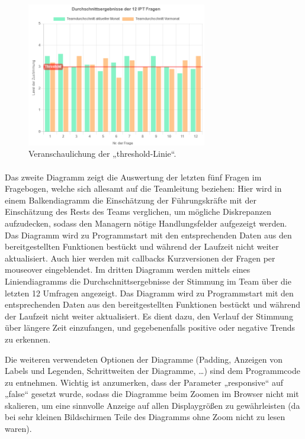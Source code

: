 \documentclass[a4paper,12pt,]{article}
\begin{document}
\begin{figure}[htb]
\centering
\includegraphics[width=0.7\textwidth]{picture.png}
\caption{Veranschaulichung der „threshold-Linie“.}
\end{figure}

\paragraph{}Das zweite Diagramm zeigt die Auswertung der letzten fünf Fragen im Fragebogen, welche sich allesamt auf die Teamleitung beziehen: Hier wird in einem Balkendiagramm die Einschätzung der Führungskräfte mit der Einschätzung des Rests des Teams verglichen, um mögliche Diskrepanzen aufzudecken, sodass den Managern nötige Handlungsfelder aufgezeigt werden. Das Diagramm wird zu Programmstart mit den entsprechenden Daten aus den bereitgestellten Funktionen bestückt und während der Laufzeit nicht weiter aktualisiert. Auch hier werden mit callbacks Kurzversionen der Fragen per mouseover eingeblendet.
Im dritten Diagramm werden mittels eines Liniendiagramms die Durchschnittsergebnisse der Stimmung im Team über die letzten 12 Umfragen angezeigt. Das Diagramm wird zu Programmstart mit den entsprechenden Daten aus den bereitgestellten Funktionen bestückt und während der Laufzeit nicht weiter aktualisiert. Es dient dazu, den Verlauf der Stimmung über längere Zeit einzufangen, und gegebenenfalls positive oder negative Trends zu erkennen.


Die weiteren verwendeten Optionen der Diagramme (Padding, Anzeigen von Labels und Legenden, Schrittweiten der Diagramme, …) sind dem Programmcode zu entnehmen.
Wichtig ist anzumerken, dass der Parameter „responsive“ auf „false“ gesetzt wurde, sodass die Diagramme beim Zoomen im Browser nicht mit skalieren, um eine sinnvolle Anzeige auf allen Displaygrößen zu gewährleisten (da bei sehr kleinen Bildschirmen Teile des Diagramms ohne Zoom nicht zu lesen waren).
\end{document}
